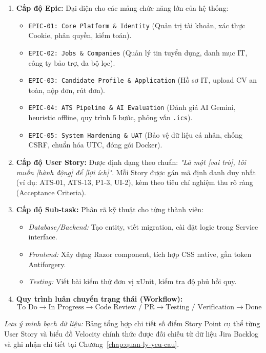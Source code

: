 \begin{enumerate}
    \item \textbf{Cấp độ Epic:} Đại diện cho các mảng chức năng lớn của hệ thống:
    \begin{itemize}
        \item \texttt{EPIC-01: Core Platform \& Identity} (Quản trị tài khoản, xác thực Cookie, phân quyền, kiểm toán).
        \item \texttt{EPIC-02: Jobs \& Companies} (Quản lý tin tuyển dụng, danh mục IT, công ty bảo trợ, đa bộ lọc).
        \item \texttt{EPIC-03: Candidate Profile \& Application} (Hồ sơ IT, upload CV an toàn, nộp đơn, rút đơn).
        \item \texttt{EPIC-04: ATS Pipeline \& AI Evaluation} (Đánh giá AI Gemini, heuristic offline, quy trình 5 bước, phỏng vấn \texttt{.ics}).
        \item \texttt{EPIC-05: System Hardening \& UAT} (Bảo vệ dữ liệu cá nhân, chống CSRF, chuẩn hóa UTC, đóng gói Docker).
    \end{itemize}
    \item \textbf{Cấp độ User Story:} Được định dạng theo chuẩn: \textit{"Là một [vai trò], tôi muốn [hành động] để [lợi ích]"}. Mỗi Story được gán mã định danh duy nhất (ví dụ: ATS-01, ATS-13, P1-3, UI-2), kèm theo tiêu chí nghiệm thu rõ ràng (Acceptance Criteria).
    \item \textbf{Cấp độ Sub-task:} Phân rã kỹ thuật cho từng thành viên:
    \begin{itemize}
        \item \textit{Database/Backend:} Tạo entity, viết migration, cài đặt logic trong Service interface.
        \item \textit{Frontend:} Xây dựng Razor component, tích hợp CSS native, gắn token Antiforgery.
        \item \textit{Testing:} Viết bài kiểm thử đơn vị xUnit, kiểm tra độ phủ hồi quy.
    \end{itemize}
    \item \textbf{Quy trình luân chuyển trạng thái (Workflow):}
    \begin{equation}
    \text{To Do} \longrightarrow \text{In Progress} \longrightarrow \text{Code Review / PR} \longrightarrow \text{Testing / Verification} \longrightarrow \text{Done}
    \end{equation}
\end{enumerate}
\textit{Lưu ý minh bạch dữ liệu:} Bảng tổng hợp chi tiết số điểm Story Point cụ thể từng User Story và biểu đồ Velocity chính thức được đối chiếu từ dữ liệu Jira Backlog và ghi nhận chi tiết tại Chương~\ref{chap:quan-ly-yeu-cau}.
